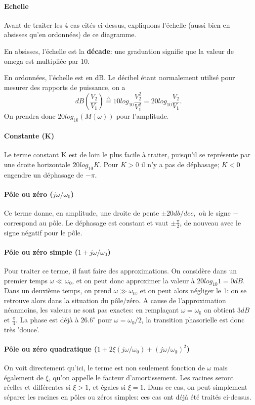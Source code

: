 \paragraph{Echelle} Avant de traiter les 4 cas cités ci-dessus, expliquons l'échelle (aussi bien en absisses qu'en ordonnées) de ce diagramme.

En absisses, l'échelle est la \textbf{décade}: une graduation signifie que la valeur de omega est multipliée par 10.

En ordonnées, l'échelle est en dB. Le décibel étant normalement utilisé pour mesurer des rapports de puissance, on a $$dB(\frac{V_2}{V_1}) \stackrel{\triangle}{=} 10log_{10}\frac{V_{2}^2}{V_{1}^2} = 20 log_{10}\frac{V_2}{V_1}.$$
On prendra donc $20log_{10}(M(\omega))$ pour l'amplitude.

\paragraph{Constante (K)}
Le terme constant K est de loin le plus facile à traiter, puisqu'il se représente par une droite horizontale $20log_{10}K$. Pour $K>0$ il n'y a pas de déphasage; $K<0$ engendre un déphasage de $-\pi$.
\paragraph{Pôle ou zéro ($j\omega/\omega_0$)}
Ce terme donne, en amplitude, une droite de pente $\pm20db/dec,$ où le signe $-$ correspond au pôle. Le déphasage est constant et vaut $\pm\frac{\pi}{2}$, de nouveau avec le signe négatif pour le pôle.
\paragraph{Pôle ou zéro simple ($1 + j\omega/\omega_0$)}
Pour traiter ce terme, il faut faire des approximations. On considère dans un premier temps $\omega \ll \omega_0$, et on peut donc approximer la valeur à $20log_{10}1 = 0dB$. Dans un deuxième temps, on prend $\omega\gg\omega_0$, et on peut alors négliger le 1: on se retrouve alors dans la situation du pôle/zéro. A cause de l'approximation néanmoins, les valeurs ne sont pas exactes: en remplaçant $\omega = \omega_0$ on obtient $3dB$ et $\frac{\pi}{4}$. La phase est déjà à $26.6^{\circ}$ pour $\omega = \omega_0/2$, la transition phasorielle est donc très 'douce'.
\paragraph{Pôle ou zéro quadratique ($1 + 2\xi(j\omega/\omega_0) + (j\omega/\omega_0)^2$)}
On voit directement qu'ici, le terme est non seulement fonction de $\omega$ mais également de $\xi$, qu'on appelle le facteur d'amortissement. Les racines seront réelles et différentes si $\xi>1$, et égales si $\xi=1$. Dans ce cas, on peut simplement séparer les racines en pôles ou zéros simples: ces cas ont déjà été traités ci-dessus.

